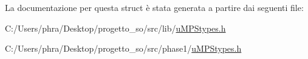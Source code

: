 La documentazione per questa struct è stata generata a partire dai seguenti file\-:\begin{DoxyCompactItemize}
\item 
C\-:/\-Users/phra/\-Desktop/progetto\-\_\-so/src/lib/\hyperlink{lib_2u_m_p_stypes_8h}{u\-M\-P\-Stypes.\-h}\item 
C\-:/\-Users/phra/\-Desktop/progetto\-\_\-so/src/phase1/\hyperlink{phase1_2u_m_p_stypes_8h}{u\-M\-P\-Stypes.\-h}\end{DoxyCompactItemize}
